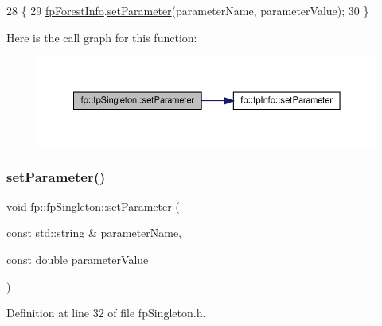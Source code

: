 \begin{DoxyCode}
28                                                                                                      \{
29                 \hyperlink{classfp_1_1fpSingleton_a85965009befa72a749ae498fa5b6ccfa}{fpForestInfo}.\hyperlink{classfp_1_1fpInfo_ae4c749c466e983cb312cc08d38b2796e}{setParameter}(parameterName, parameterValue);
30             \}
\end{DoxyCode}
Here is the call graph for this function\+:\nopagebreak
\begin{figure}[H]
\begin{center}
\leavevmode
\includegraphics[width=350pt]{classfp_1_1fpSingleton_a90f275b256694ea7b16577d547a33044_cgraph}
\end{center}
\end{figure}
\mbox{\label{classfp_1_1fpSingleton_a19dd80e98acb4dd3e82be5e744840d1f}} 
\subsubsection{\texorpdfstring{set\+Parameter()}{setParameter()}\hspace{0.1cm}{\footnotesize\ttfamily [2/3]}}
{\footnotesize\ttfamily void fp\+::fp\+Singleton\+::set\+Parameter (\begin{DoxyParamCaption}\item[{const std\+::string \&}]{parameter\+Name,  }\item[{const double}]{parameter\+Value }\end{DoxyParamCaption})\hspace{0.3cm}{\ttfamily [inline]}}



Definition at line 32 of file fp\+Singleton.\+h.


